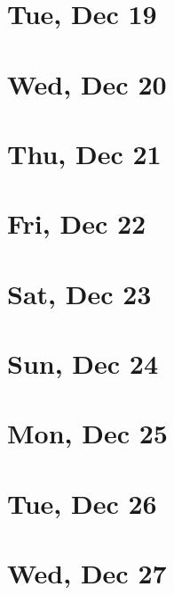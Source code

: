 	\section{Tue, Dec 19}
		
		
	\section{Wed, Dec 20}
		
		
	\section{Thu, Dec 21}
		
		
	\section{Fri, Dec 22}
		
		
	\section{Sat, Dec 23}
		
		
	\section{Sun, Dec 24}
		
		
	\section{Mon, Dec 25}
		
		
	\section{Tue, Dec 26}
		
		
	\section{Wed, Dec 27}
		
		
